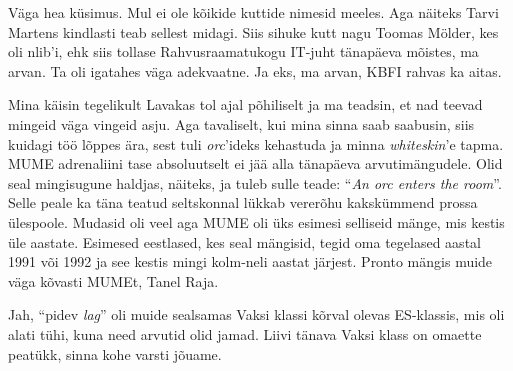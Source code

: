 
Väga hea küsimus. Mul ei ole kõikide kuttide nimesid meeles. Aga näiteks Tarvi 
Martens kindlasti teab sellest midagi. Siis sihuke 
kutt nagu Toomas Mölder, kes oli nlib'i, ehk siis 
tollase Rahvusraamatukogu IT-juht  tänapäeva mõistes, ma arvan. Ta oli igatahes 
väga adekvaatne. Ja eks, ma arvan, KBFI rahvas ka aitas.


Mina käisin tegelikult Lavakas tol ajal põhiliselt ja ma teadsin, et nad teevad 
mingeid väga vingeid asju. Aga tavaliselt, kui mina sinna saab saabusin, siis 
kuidagi töö lõppes ära, sest tuli \emph{orc}'ideks kehastuda ja minna 
\emph{whiteskin}'e tapma. MUME  adrenaliini tase absoluutselt ei jää alla 
tänapäeva arvutimängudele. Olid seal mingisugune haldjas, näiteks, ja tuleb sulle 
teade: \enquote{\emph{An orc enters the room}}. Selle peale ka täna teatud  
seltskonnal  lükkab vererõhu kakskümmend prossa ülespoole. Mudasid oli veel aga 
MUME oli üks esimesi selliseid mänge, mis kestis üle aastate. Esimesed 
eestlased, kes seal mängisid, tegid oma tegelased aastal 1991 või 1992 ja see 
kestis mingi kolm-neli aastat järjest. Pronto mängis muide 
väga kõvasti MUMEt, Tanel Raja. 


Jah, \enquote{pidev \emph{lag}} oli muide sealsamas Vaksi klassi kõrval olevas 
ES-klassis, mis oli alati tühi, kuna need arvutid olid jamad. Liivi tänava 
Vaksi klass on omaette peatükk, sinna kohe varsti jõuame.


